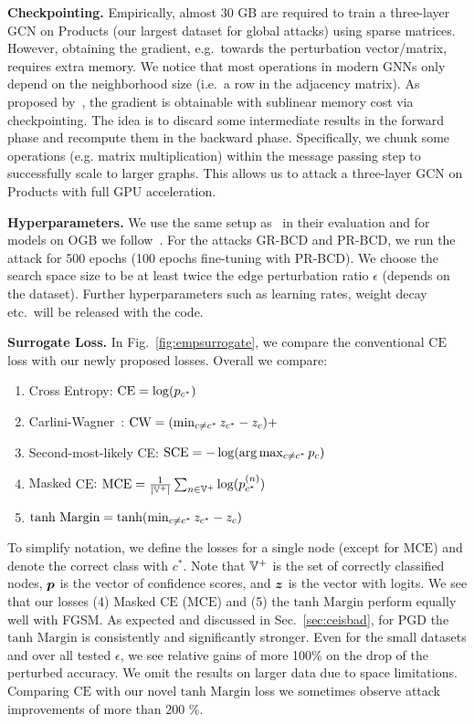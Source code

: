 \documentclass[sigconf, review]{acmart}
\begin{document}
\textbf{Checkpointing.} Empirically, almost 30 GB are required to train a three-layer GCN on Products (our largest dataset for global attacks) using sparse matrices. However, obtaining the gradient, e.g.\ towards the perturbation vector/matrix, requires extra memory. We notice that most operations in modern GNNs only depend on the neighborhood size (i.e.~a row in the adjacency matrix). As proposed by~\citet{Chen2016}, the gradient is obtainable with sublinear memory cost via checkpointing. The idea is to discard some intermediate results in the forward phase and recompute them in the backward phase. Specifically, we chunk some operations (e.g. matrix multiplication) within the message passing step to successfully scale to larger graphs. This allows us to attack a three-layer GCN on Products with full GPU acceleration.

\textbf{Hyperparameters.} We use the same setup as~\citet{Geisler2020} in their evaluation and for models on OGB we follow~\citet{Hu2020}. For the attacks GR-BCD and PR-BCD, we run the attack for 500 epochs (100 epochs fine-tuning with PR-BCD). We choose the search space size to be at least twice the edge perturbation ratio \(\epsilon\) (depends on the dataset). Further hyperparameters such as learning rates, weight decay etc.\ will be released with the code.

\textbf{Surrogate Loss.} In Fig.~\ref{fig:empsurrogate}, we compare the conventional \(\text{CE}\) loss with our newly proposed losses. Overall we compare:
\begin{enumerate}
  \item Cross Entropy: \(\text{CE} = \log({p}_{c^*})\)
  \item Carlini-Wagner~\cite{Carlini2017}: \(\text{CW} = (\min_{c \ne c^*} {z}_{c^*} - {z}_{c})+\)
  \item Second-most-likely CE: \(\text{SCE} = -\log(\arg\max_{c \ne c^*} {p}_{c})\)
  \item Masked \(\text{CE}\): \(\text{MCE} = \frac{1}{|{\mathbb{V}}^+|} \sum_{n \in {\mathbb{V}}^+} \log({p}_{c^*}^{(n)})\)
  \item \(\text{tanh Margin} = \tanh(\min_{c \ne c^*} {z}_{c^*} - {z}_{c})\)
\end{enumerate}
To simplify notation, we define the losses for a single node (except for \(\text{MCE}\)) and denote the correct class with \(c^*\). Note that \({\mathbb{V}}^+\) is the set of correctly classified nodes, \({\bm{p}}\) is the vector of confidence scores, and \({\bm{z}}\) is the vector with logits. 
We see that our losses (4) Masked \(\text{CE}\) (\(\text{MCE}\)) and (5) the \(\text{tanh Margin}\) perform equally well with FGSM. As expected and discussed in Sec.~\ref{sec:ceisbad}, for PGD the \(\text{tanh Margin}\) is consistently and significantly stronger. Even for the small datasets and over all tested \(\epsilon\), we see relative gains of more 100\% on the drop of the perturbed accuracy. We omit the results on larger data due to space limitations. Comparing \(\text{CE}\) with our novel \(\text{tanh Margin}\) loss we sometimes observe attack improvements of more than 200 \%.
\end{document}
